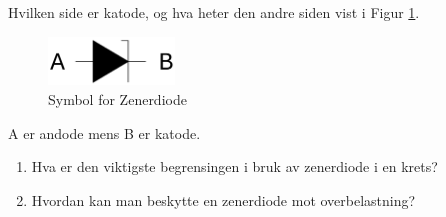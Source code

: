 \begin{question}[name=Oppgave, topic=zenerdioder]
Hvilken side er katode, og hva heter den andre siden vist i Figur \ref{fig:zenBasic}.

	\begin{figure}[H]
	\centering
	\includegraphics[width=0.3\textwidth]{diode/figurer/zenBasic.png}
	\caption{Symbol for Zenerdiode}
	\label{fig:zenBasic}
	\end{figure}

\end{question}

\vspace{0.5cm} %

\begin{solution}[name=Løsningsforslag oppgave]
A er andode mens B er katode.

\end{solution}

\begin{question}[name=Oppgave, topic=zenerdioder]


\begin{enumerate}[label=\roman*)]
	\item Hva er den viktigste begrensingen i bruk av zenerdiode i en krets?
	\item Hvordan kan man beskytte en zenerdiode mot overbelastning?
\end{enumerate}

\end{question}

\vspace{0.5cm} %

